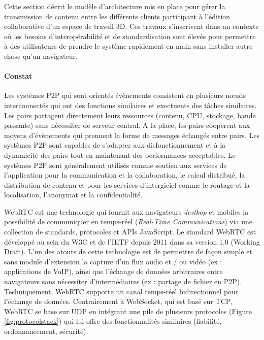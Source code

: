 Cette section décrit le modèle d'architecture mis en 
place pour gérer la transmission de contenu entre les différents clients 
participant à l'édition collaborative d'un espace de travail 3D. 
Ces travaux s'inscrivent dans un contexte où les besoins d'interopérabilité 
et de standardisation sont élevés pour permettre à des utilisateurs de 
prendre le système rapidement en main sans installer autre chose qu'un 
navigateur. 

\paragraph{Constat}

Les systèmes \gls{P2P} qui sont orientés évènements consistent en plusieurs n\oe uds 
interconnectés qui ont des fonctions similaires et exectuents des tâches 
similaires. Les pairs partagent directement leurs ressources (contenu, CPU, 
stockage, bande passante) sans nécessiter de serveur central. A la place, les 
pairs coopèrent aux moyens d'évènements qui prennent la forme de messages 
échangés entre pairs. Les systèmes \gls{P2P} sont capables de s'adapter aux 
disfonctionnement et à la dynamicité des pairs tout en maintenant des 
performances acceptables. Le systèmes \gls{P2P} sont généralement utilisés comme 
soutien aux services de l'application pour la communication et la collaboration, le 
calcul distribué, la distribution de contenu et pour les services d'intergiciel comme 
le routage et la localisation, l'anonymat et la confidentialité.

\gls{WebRTC} est une technologie qui fournit aux navigateurs 
\textit{destkop} et mobiles la possibilité de communiquer en temps-réel 
(\textit{Real-Time Communications}) via une collection de standards, 
protocoles et \glspl{API} JavaScript. 
Le standard \gls{WebRTC} est développé au sein du \gls{W3C} et de 
l'\gls{IETF} depuis 2011 dans sa version 1.0 (Working Draft). 
L'un des atouts de cette technologie est de permettre de façon simple et 
sans module d'extension la capture d'un flux audio et / ou vidéo (ex : 
applications de VoIP), ainsi que l'échange de données arbitraires entre 
navigateurs sans nécessiter d'intermédiaires (ex : partage de fichier en 
\gls{P2P}).
Techniquement, \gls{WebRTC} supporte un canal temps-réel 
bidirectionnel pour l'échange de données. Contrairement à 
\gls{WebSocket}, qui est basé sur \gls{TCP}, \gls{WebRTC} se base sur 
\acrshort{UDP} en intégrant une pile de plusieurs protocoles (Figure 
\ref{fig:protocolstack}) qui lui offre des fonctionnalités similaires (fiabilité, 
ordonnancement, sécurité). 


